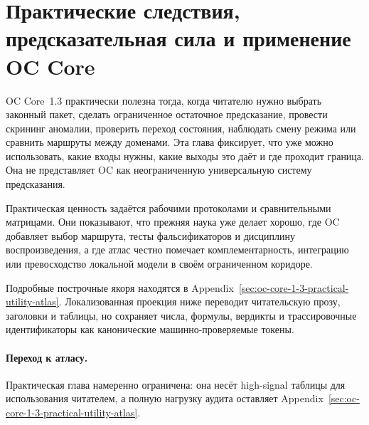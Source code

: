 \section{Практические следствия, предсказательная сила и применение OC Core}
\label{sec:oc-core-1-3-practical-utility}
\label{sec:oc-core-1-3-practical-utility-ru}

OC Core~1.3 практически полезна тогда, когда читателю нужно выбрать законный
пакет, сделать ограниченное остаточное предсказание, провести скрининг
аномалии, проверить переход состояния, наблюдать смену режима или сравнить
маршруты между доменами. Эта глава фиксирует, что уже можно использовать,
какие входы нужны, какие выходы это даёт и где проходит граница. Она не
представляет OC как неограниченную универсальную систему предсказания.

Практическая ценность задаётся рабочими протоколами и сравнительными матрицами. Они
показывают, что прежняя наука уже делает хорошо, где OC добавляет выбор
маршрута, тесты фальсификаторов и дисциплину воспроизведения, а где атлас честно
помечает комплементарность, интеграцию или превосходство локальной модели в
своём ограниченном коридоре.

Подробные построчные якоря находятся в
Appendix~\ref{sec:oc-core-1-3-practical-utility-atlas}. Локализованная
проекция ниже переводит читательскую прозу, заголовки и таблицы, но сохраняет
числа, формулы, вердикты и трассировочные идентификаторы как канонические
машинно-проверяемые токены.

\begingroup
\small

\endgroup

\paragraph{Переход к атласу.}
Практическая глава намеренно ограничена: она несёт high-signal таблицы для
использования читателем, а полную нагрузку аудита оставляет
Appendix~\ref{sec:oc-core-1-3-practical-utility-atlas}.
